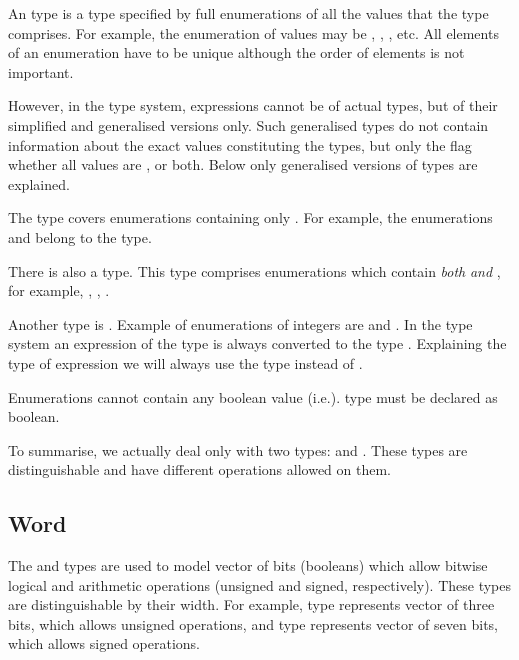 An \Enum type is a type specified by full enumerations of all the values
that the type comprises.  For example, the enumeration of values may be
, , , etc.  All elements of an enumeration have
to be unique although the order of elements is not important.

However, in the \nusmv type system, expressions cannot be of actual
\Enum types, but of their simplified and generalised versions
only. Such generalised \Enum types do not contain information about
the exact values constituting the types, but only the flag whether all
values are  ,
 or both. Below only generalised versions
of \Enum types are explained.

The \SymbEnum type covers enumerations containing only . For example, the enumerations 
and  belong to the \SymbEnum type.

There is also a \IntSymbEnum type.
This type comprises enumerations which contain \emph{both}
 \emph{and} , for
example, , ,
.

Another \Enum type is \IntEnum.
Example of enumerations of integers are  and .
In the \nusmv type system an expression of the type \IntEnum
is always converted to the type \Integer. Explaining
the type of expression we will always use the type \Integer
instead of \IntEnum.

Enumerations cannot contain any boolean value (i.e.).
\Boolean type must be declared as boolean.

To summarise, we actually deal only with two \Enum types: \SymbEnum and
\IntSymbEnum. These types are distinguishable and have different operations
allowed on them.


\subsection{Word}
\label{Word Type}

The \UWord and \SWord types are used to model vector of bits (booleans) which
allow bitwise logical and arithmetic operations (unsigned and signed, respectively).
%
These types are distinguishable by their width. For example, type
\UWord[3] represents vector of three bits, which allows unsigned operations, and type
\SWord[7] represents vector of seven bits, which allows signed operations.


